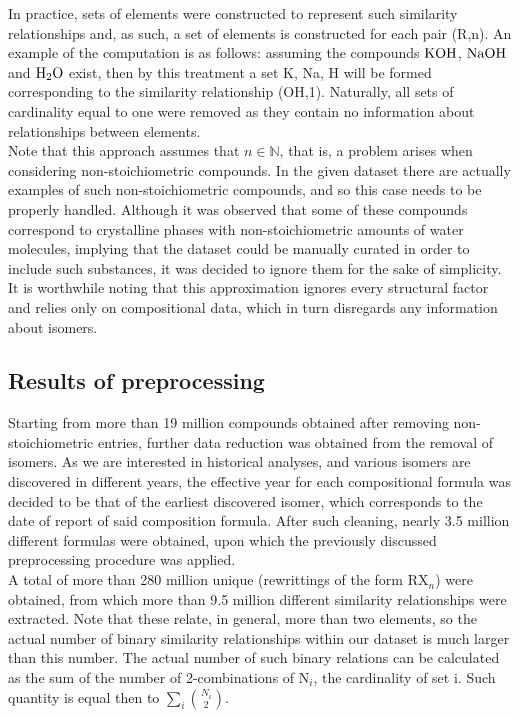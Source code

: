 \documentclass[article]{article}
\begin{document}
In practice, sets of elements were constructed to represent such similarity relationships and, as such, a set of elements is constructed for each pair (R,n). An example of the computation is as follows: assuming the compounds $\ce{KOH}$, $\ce{NaOH}$ and $\ce{H2O}$ exist, then by this treatment a set {K, Na, H} will be formed corresponding to the similarity relationship (OH,1). Naturally, all sets of cardinality equal to one were removed as they contain no information about relationships between elements.\\

Note that this approach assumes that $n \in \mathbb{N}$, that is, a problem arises when considering non-stoichiometric compounds. In the given dataset there are actually examples of such non-stoichiometric compounds, and so this case needs to be properly handled. Although it was observed that some of these compounds correspond to crystalline phases with non-stoichiometric amounts of water molecules, implying that the dataset could be manually curated in order to include such substances, it was decided to ignore them for the sake of simplicity. It is worthwhile noting that this approximation ignores every structural factor and relies only on compositional data, which in turn disregards any information about isomers.\\

\subsection{Results of preprocessing}
Starting from more than 19 million compounds obtained after removing non-stoichiometric entries, further data reduction was obtained from the removal of isomers. As we are interested in historical analyses, and various isomers are discovered in different years, the effective year for each compositional formula was decided to be that of the earliest discovered isomer, which corresponds to the date of report of said composition formula. After such cleaning, nearly 3.5 million different formulas were obtained, upon which the previously discussed preprocessing procedure was applied.\\

A total of more than 280 million unique  (rewrittings of the form RX$_n$) were obtained, from which more than 9.5 million different similarity relationships were extracted. Note that these  relate, in general, more than two elements, so the actual number of binary similarity relationships within our dataset is much larger than this number. The actual number of such binary relations can be calculated as the sum of the number of 2-combinations of N$_i$, the cardinality of set i. Such quantity is equal then to $\sum_i \binom{N_i}{2}$.\\
\end{document}

